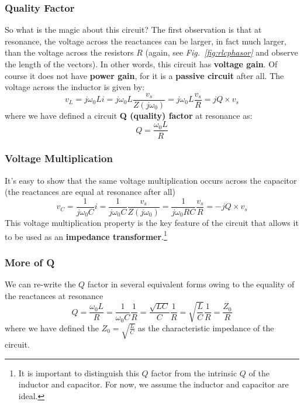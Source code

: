\subsubsection{Quality Factor}
So what is the magic about this circuit?  The first observation is that at resonance, the voltage across the reactances can be larger, in fact much larger, than the voltage across the resistors $R$ (again, see \emph{Fig.~\ref{fig:rlcphasor}} and observe the length of the vectors).  In other words, this circuit has \textbf{voltage gain}.  Of course it does not have \textbf{power gain}, for it is a \textbf{passive circuit} after all.  The voltage across the inductor is given by:
    \begin{equation}
        v_L = j\omega_0 L i = j\omega_0 L \frac{v_s}{Z(j\omega_0)} =  j\omega_0 L \frac{v_s}{R} = j Q \times v_s
    \end{equation}
where we have defined a circuit \textbf{Q (quality) factor} at resonance as:
    \begin{equation}
        Q = \frac{\omega_0 L}{R}
    \end{equation}
\subsubsection{Voltage Multiplication}
It's easy to show that the same voltage multiplication occurs across the capacitor (the reactances are equal at resonance after all)
    \begin{equation}
        v_C = \frac{1}{j\omega_0 C} i = \frac{1}{j\omega_0 C}
        \frac{v_s}{Z(j\omega_0)} = \frac{1}{j\omega_0 R C} \frac{v_s}{R} = - j Q
        \times v_s
    \end{equation}
This voltage multiplication property is the key feature of the circuit that allows it to be used as an \textbf{impedance transformer}.\footnote{It is important to distinguish this $Q$ factor from the intrinsic $Q$ of the inductor and capacitor.  For now, we assume the inductor and capacitor are ideal.}
\subsubsection{More of Q}
We can re-write the $Q$ factor in several equivalent forms owing to the equality of the reactances at resonance
    \begin{equation} \label{eq:qdefs}
        Q = \frac{\omega_0 L}{R} = \frac{1}{\omega_0 C} \frac{1}{R} = \frac{\sqrt{LC}}{C} \frac{1}{R} = \sqrt{\frac{L}{C}} \frac{1}{R} = \frac{Z_0}{R}
    \end{equation}
where we have defined the $Z_0 = \sqrt{\tfrac{L}{C}}$ as the characteristic impedance of the circuit.

